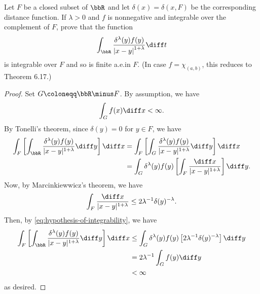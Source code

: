 \begin{problem}
Let $F$ be a closed subset of $\bbR$ and let $\delta(x)=\delta(x,F)$ be
the corresponding distance function. If $\lambda>0$ and $f$ is nonnegative
and integrable over the complement of $F$, prove that the function
\[
\int_{\bbR}\frac{\delta^\lambda(y)f(y)}{\left|x-y\right|^{1+\lambda}}\diff
t
\]
is integrable over $F$ and so is finite a.e.\@ in $F$. (In case
$f=\chi_{(a,b)}$, this reduces to Theorem 6.17.)
\end{problem}
\begin{proof}
Set $G\coloneqq\bbR\minus F$. By assumption, we have
\begin{equation}
  \label{eq:hypothesis-of-integrability}
\int_Gf(x)\diff x<\infty.
\end{equation}
By Tonelli's theorem, since $\delta(y)=0$ for $y\in F$, we have
\begin{equation}
\label{eq:application-of-tonelli}
\begin{aligned}[t]
\int_F\left[\int_\bbR\frac{\delta^\lambda(y)f(y)}{|x-y|^{1+\lambda}}\diff
  y\right]\diff x
&=\int_F\left[\int_G\frac{\delta^\lambda(y)f(y)}{|x-y|^{1+\lambda}}\diff
  y\right]\diff x\\
&=\int_G\delta^\lambda(y)f(y)\left[\int_F\frac{\diff
    x}{|x-y|^{1+\lambda}}\right]\diff y.
\end{aligned}
\end{equation}
Now, by Marcinkiewwicz's theorem, we have
\begin{equation}
  \label{eq:application-of-marcinkiewicz}
\int_F\frac{\diff x}{|x-y|^{1+\lambda}}\leq
2\lambda^{-1}\delta(y)^{-\lambda}.
\end{equation}
Then, by \eqref{eq:hypothesis-of-integrability}, we have
\begin{equation}
\label{eq:application-of-fubini-2}
\begin{aligned}[t]
 \int_F\left[\int_\bbR\frac{\delta^{\lambda}(y)f(y)}{|x-y|^{1+\lambda}}\diff
y\right]\diff x
&\leq\int_G\delta^\lambda(y)f(y)\left[2\lambda^{-1}\delta(y)^{-\lambda}\right]\diff
y\\
&=2\lambda^{-1}\int_Gf(y)\diff y\\
&<\infty
\end{aligned}
\end{equation}
as desired.
\end{proof}
\newpage

